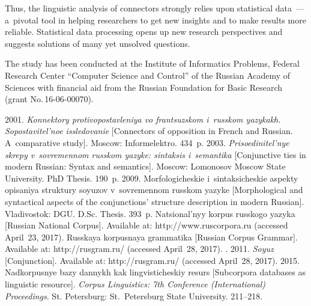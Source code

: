 \begin{multicols}{2}
  Thus, the linguistic analysis of connectors strongly relies upon statistical  
data~--- a~pivotal tool in helping researchers to get new insights and to make 
results more reliable. Statistical data processing opens up new research 
perspectives and suggests solutions of many yet unsolved questions.

\vspace*{-3pt}
  

\Ack  
\noindent
The study has been conducted at the Institute of Informatics 
Problems, Federal Research Center 
``Computer Science and Control'' of the
Russian Academy of Sciences with financial aid from the Russian 
Foundation for Basic Research (grant No.\,16-06-00070).



\renewcommand{\bibname}{\protect\rmfamily References}




{\small\frenchspacing
{\baselineskip=10.65pt
\begin{thebibliography}{99}
    

 2001. \textit{Konnektory pro\-ti\-vo\-po\-stavle\-niya 
vo frantsuzskom i~russkom yazykakh. So\-po\-sta\-vi\-tel'\-noe issledovanie} 
[Connectors of opposition in French and Russian. A~comparative study]. 
Moscow: Informelektro. 434~p.
 2003. \textit{Prisoedinitel'nye skrepy v~sovremennom 
rus\-skom yazyke: sintaksis i~semantika} [Conjunctive ties in modern Russian: 
Syntax and semantics]. Moscow: Lomonosov Moscow State University. PhD 
Thesis. 190~p.
 2009. Morfologicheskie i~sin\-tak\-si\-che\-skie aspekty 
opisaniya struktury soyuzov v~so\-vre\-men\-nom russkom yazyke [Morphological 
and syntactical aspects of the conjunctions' structure description in modern 
Russian]. Vladivostok: DGU. D.Sc. Thesis. 393~p.
Natsional'nyy korpus russkogo yazyka [Russian National 
Corpus]. Available at: {\sf http://www.ruscorpora.ru} (accessed 
April~23, 2017).
Russkaya korpusnaya grammatika [Russian Corpus 
Grammar]. Available at: {\sf http://rusgram.ru/} (accessed April~28, 
2017).
. 2011. \textit{Soyuz} 
[Conjunction]. Available at: {\sf http://rusgram.ru/} (accessed April~28, 2017).
 2015. Nadkorpusnye bazy dannykh kak lingvisticheskiy 
resurs [Subcorpora databases as linguistic resource]. \textit{Corpus Linguistics: 7th Conference 
(International) Proceedings}. St. Petersburg: St.\ Petersburg State University.  
211--218.


\end{thebibliography}}}
\end{multicols}
